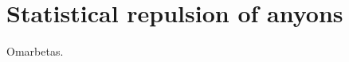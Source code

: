 \documentclass[a4paper,10pt,oneside]{book}
\theoremstyle{plain}
\theoremstyle{definition}
\theoremstyle{remark}
\DeclarePairedDelimiter\abs{\lvert}{\rvert}
\begin{document}

\chapter{Statistical repulsion of anyons}\label{chap:statistical repulsion}

Omarbetas.




\end{document}
